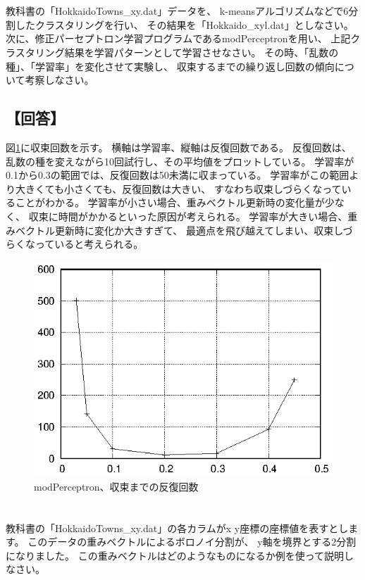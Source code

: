 \documentclass[a4j]{jarticle}
\begin{document}
\section{}
教科書の「HokkaidoTowns\_xy\@.dat」データを、
k-meansアルゴリズムなどで6分割したクラスタリングを行い、
その結果を「Hokkaido\_xyl\@.dat」としなさい。
次に、修正パーセプトロン学習プログラムであるmodPerceptronを用い、
上記クラスタリング結果を学習パターンとして学習させなさい。
その時、「乱数の種」、「学習率」を変化させて実験し、
収束するまでの繰り返し回数の傾向について考察しなさい。

\subsection{【回答】}
図\ref{fig:modPerceptron}に収束回数を示す。
横軸は学習率、縦軸は反復回数である。
反復回数は、乱数の種を変えながら10回試行し、その平均値をプロットしている。
学習率が0.1から0.3の範囲では、反復回数は50未満に収まっている。
学習率がこの範囲より大きくても小さくても、反復回数は大きい、
すなわち収束しづらくなっていることがわかる。
学習率が小さい場合、重みベクトル更新時の変化量が少なく、
収束に時間がかかるといった原因が考えられる。
学習率が大きい場合、重みベクトル更新時に変化か大きすぎて、
最適点を飛び越えてしまい、収束しづらくなっていると考えられる。

\begin{figure}[tbp]
 \begin{center}
  \includegraphics[width=0.5\hsize]{fig/modPerceptron.eps}
 \end{center}
 \caption{modPerceptron、収束までの反復回数}
 \label{fig:modPerceptron}
\end{figure}


\section{}
教科書の「HokkaidoTowns\_xy\@.dat」の各カラムがx y座標の座標値を表すとします。
このデータの重みベクトルによるボロノイ分割が、
y軸を境界とする2分割になりました。
この重みベクトルはどのようなものになるか例を使って説明しなさい。
\end{document}
